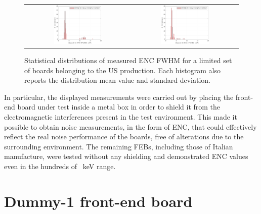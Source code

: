 \begin{figure}[h!]
\begin{tabular}{cc}
        \includegraphics[width=0.475\textwidth]{Images/chap2/results/ENC_23.pdf} & \includegraphics[width=0.475\textwidth]{Images/chap2/results/ENC_31.pdf}\\
    \end{tabular}
    \caption{Statistical distributions of measured ENC FWHM for a limited set of boards belonging to the US production. Each histogram also reports the distribution mean value and standard deviation.}
    \label{figFEBNoise}
\end{figure}

\noindent
In particular, the displayed measurements were carried out by placing the front-end board under test inside a metal box in order to shield it from the electromagnetic interferences present in the test environment. This made it possible to obtain noise measurements, in the form of ENC, that could effectively reflect the real noise performance of the boards, free of alterations due to the surrounding environment. The remaining FEBs, including those of Italian manufacture, were tested without any shielding and demonstrated ENC values even in the hundreds of \SI{}{\kilo\electronvolt} range.



\section{Dummy-1 front-end board} \label{sec22}

